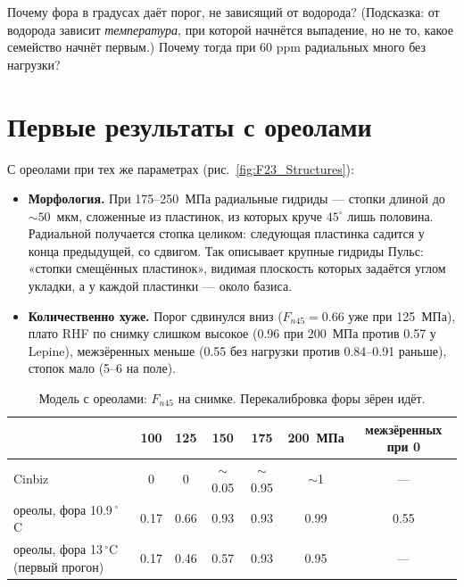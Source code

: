 \begin{exercise}
Почему фора в градусах даёт порог, не зависящий от водорода? (Подсказка: от водорода зависит
\emph{температура}, при которой начнётся выпадение, но не то, какое семейство начнёт первым.)
Почему тогда при 60 ppm радиальных много без нагрузки?
\end{exercise}

\section{Первые результаты с ореолами}


С ореолами при тех же параметрах (рис.~\ref{fig:F23_Structures}):
\begin{itemize}
\item \textbf{Морфология.} При 175--250~МПа радиальные гидриды --- стопки длиной до $\sim50$~мкм,
  сложенные из пластинок, из которых круче $45^\circ$ лишь половина. Радиальной получается
  стопка целиком: следующая пластинка садится у конца предыдущей, со сдвигом. Так описывает
  крупные гидриды Пульс: «стопки смещённых пластинок», видимая плоскость которых задаётся углом
  укладки, а у каждой пластинки --- около базиса.
\item \textbf{Количественно хуже.} Порог сдвинулся вниз ($F_{n45}=0.66$ уже при 125~МПа), плато
  RHF по снимку слишком высокое (0.96 при 200~МПа против 0.57 у Lepine), межзёренных меньше (0.55
  без нагрузки против 0.84--0.91 раньше), стопок мало (5--6 на поле).
\end{itemize}

\begin{table}[htbp]\centering\small
\caption{Модель с ореолами: $F_{n45}$ на снимке. Перекалибровка форы зёрен идёт.}
\begin{tabular}{lcccccc}\toprule
& 100 & 125 & 150 & 175 & 200~МПа & межзёренных при 0\\\midrule
Cinbiz & 0 & 0 & $\sim$0.05 & $\sim$0.95 & $\sim$1 & ---\\
ореолы, фора 10.9\,$^\circ$C & 0.17 & 0.66 & 0.93 & 0.93 & 0.99 & 0.55\\
ореолы, фора 13\,$^\circ$C (первый прогон) & 0.17 & 0.46 & 0.57 & 0.93 & 0.95 & ---\\
\bottomrule
\end{tabular}
\end{table}

